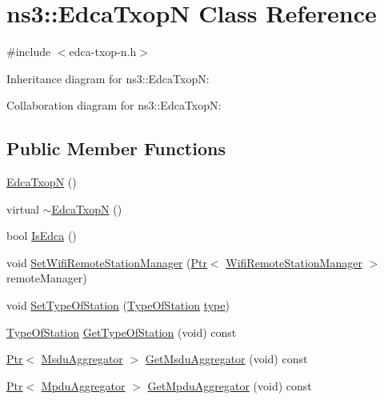 \hypertarget{classns3_1_1EdcaTxopN}{}\section{ns3\+:\+:Edca\+TxopN Class Reference}
\label{classns3_1_1EdcaTxopN}


{\ttfamily \#include $<$edca-\/txop-\/n.\+h$>$}



Inheritance diagram for ns3\+:\+:Edca\+TxopN\+:


Collaboration diagram for ns3\+:\+:Edca\+TxopN\+:
\subsection*{Public Member Functions}
\begin{DoxyCompactItemize}
\item 
\hyperlink{classns3_1_1EdcaTxopN_a82d5148017f018117867977e682940ae}{Edca\+TxopN} ()
\item 
virtual \hyperlink{classns3_1_1EdcaTxopN_a6a09b7ccaaf7ac82cc3a4527d71700cf}{$\sim$\+Edca\+TxopN} ()
\item 
bool \hyperlink{classns3_1_1EdcaTxopN_a24cf3adc4d818065d4571ca4162c65d6}{Is\+Edca} ()
\item 
void \hyperlink{classns3_1_1EdcaTxopN_a970b9c67fab2744466283724064cc6fa}{Set\+Wifi\+Remote\+Station\+Manager} (\hyperlink{classns3_1_1Ptr}{Ptr}$<$ \hyperlink{classns3_1_1WifiRemoteStationManager}{Wifi\+Remote\+Station\+Manager} $>$ remote\+Manager)
\item 
void \hyperlink{classns3_1_1EdcaTxopN_a44f5b0b6cbe32e15b5c983a8ab8c06b4}{Set\+Type\+Of\+Station} (\hyperlink{namespacens3_a21fd18ff410cecc971a0c27634830445}{Type\+Of\+Station} \hyperlink{visualizer-ideas_8txt_add98db9e15e2a58cf2b57623e7aa893a}{type})
\item 
\hyperlink{namespacens3_a21fd18ff410cecc971a0c27634830445}{Type\+Of\+Station} \hyperlink{classns3_1_1EdcaTxopN_a6a0659df3e1baa6c39b403009eb234b2}{Get\+Type\+Of\+Station} (void) const 
\item 
\hyperlink{classns3_1_1Ptr}{Ptr}$<$ \hyperlink{classns3_1_1MsduAggregator}{Msdu\+Aggregator} $>$ \hyperlink{classns3_1_1EdcaTxopN_a77aeb47db8b8c53351cfb3b5bc2fc771}{Get\+Msdu\+Aggregator} (void) const 
\item 
\hyperlink{classns3_1_1Ptr}{Ptr}$<$ \hyperlink{classns3_1_1MpduAggregator}{Mpdu\+Aggregator} $>$ \hyperlink{classns3_1_1EdcaTxopN_aa8beff92afb46fd336cdf35cb0f451c9}{Get\+Mpdu\+Aggregator} (void) const 

\end{DoxyCompactItemize}
